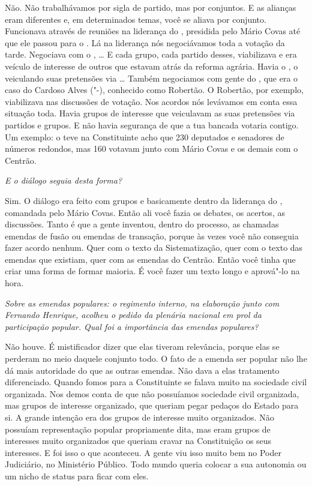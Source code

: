 Não. Não trabalhávamos por sigla de partido, mas por
conjuntos. E as alianças eram diferentes e, em determinados temas, você
se aliava por conjunto. Funcionava através de reuniões na liderança do
, presidida pelo Mário Covas até que ele passou para o . Lá na
liderança nós negociávamos toda a votação da tarde. Negociava com o ,
\ldots{} E cada grupo, cada partido desses, viabilizava e era veículo de
interesse de outros que estavam atrás da reforma agrária. Havia o , o
 veiculando suas pretensões via \ldots{} Também negociamos com gente do
, que era o caso do Cardoso Alves ("-), conhecido como
Robertão. O Robertão, por exemplo, viabilizava nas discussões de
votação. Nos acordos nós levávamos em conta essa situação toda. Havia
grupos de interesse que veiculavam as suas pretensões via partidos e
grupos. E não havia segurança de que a tua bancada votaria contigo. Um
exemplo: o  teve na Constituinte acho que 230 deputados e senadores
de números redondos, mas 160 votavam junto com Mário Covas e os demais
com o Centrão.

\medskip

\noindent\emph{E o diálogo seguia desta forma?}

Sim. O diálogo era feito com grupos e basicamente dentro
da liderança do , comandada pelo Mário Covas. Então ali você fazia
os debates, os acertos, as discussões. Tanto é que a gente inventou,
dentro do processo, as chamadas emendas de fusão ou emendas de
transação, porque às vezes você não conseguia fazer acordo nenhum. Quer
com o texto da Sistematização, quer com o texto das emendas que
existiam, quer com as emendas do Centrão. Então você tinha que criar uma
forma de formar maioria. É você fazer um texto longo e aprová"-lo na
hora.

\medskip

\noindent\emph{Sobre as emendas populares: o regimento interno, na elaboração
junto com Fernando Henrique, acolheu o pedido da plenária nacional em
prol da participação popular. Qual foi a importância das emendas
populares?}

Não houve. É mistificador dizer que elas tiveram
relevância, porque elas se perderam no meio daquele conjunto todo. O
fato de a emenda ser popular não lhe dá mais autoridade do que as outras
emendas. Não dava a elas tratamento diferenciado. Quando fomos para a
Constituinte se falava muito na sociedade civil organizada. Nos demos
conta de que não possuíamos sociedade civil organizada, mas grupos de
interesse organizado, que queriam pegar pedaços do Estado para si. A
grande intenção era dos grupos de interesse muito organizados. Não
possuíam representação popular propriamente dita, mas eram grupos de
interesses muito organizados que queriam cravar na Constituição os seus
interesses. E foi isso o que aconteceu. A gente viu isso muito bem no
Poder Judiciário, no Ministério Público. Todo mundo queria colocar a sua
autonomia ou um nicho de status para ficar com eles.

